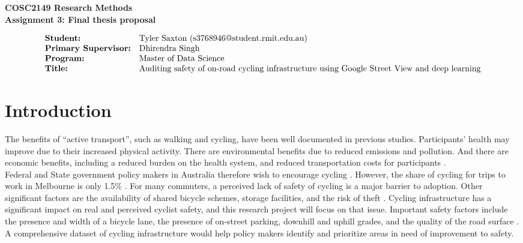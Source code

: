 \documentclass{article}
\begin{document}
\begin{titlepage}
	\begin{center}
	\huge{\bfseries COSC2149 Research Methods} \\
	[0.5cm]
	\Large{\bfseries Assignment 3: Final thesis proposal} \\
	[0.5cm]
	\end{center}
	\begin{flushleft}
	\[
	\begin{array}{ll}
	\normalsize
	\textbf{Student:} & \textup{Tyler Saxton (s3768946@student.rmit.edu.au)}\\
	\textbf{Primary Supervisor:} & \textup{Dhirendra Singh}\\
	\textbf{Program:} & \textup{Master of Data Science} \\
	\textbf{Title:} & \textup{Auditing safety of on-road cycling infrastructure using Google Street View and deep learning} \\
	\end{array}
	\]
	\end{flushleft}
\end{titlepage}

\section{Introduction}

The benefits of ``active transport'', such as walking and cycling, have been well documented in previous studies.  Participants' health may improve due to their increased physical activity.  There are environmental benefits due to reduced emissions and pollution.  And there are economic benefits, including a reduced burden on the health system, and reduced transportation costs for participants \cite{LEE2012219} \cite{RABL2012121}.
\\

Federal and State government policy makers in Australia therefore wish to encourage cycling \cite{federal_policy_2019} \cite{state_policy_2020}.  However, the share of cycling for trips to work in Melbourne is only 1.5\% \cite{melbactive}.  For many commuters, a perceived lack of safety of cycling is a major barrier to adoption.  Other significant factors are the availability of shared bicycle schemes, storage facilities, and the risk of theft \cite{WILSON2018234}. Cycling infrastructure has a significant impact on real and perceived cyclist safety, and this research project will focus on that issue.  Important safety factors include the presence and width of a bicycle lane, the presence of on-street parking, downhill and uphill grades, and the quality of the road surface \cite{BIKESAFETY} \cite{Teschke2012}.  A comprehensive dataset of cycling infrastructure would help policy makers identify and prioritize areas in need of improvement to safety.
\\
\end{document}

